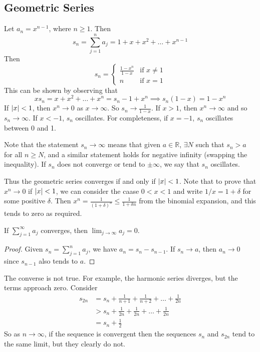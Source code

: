 \subsection{Geometric Series}
Let \(a_n = x^{n-1}\), where \(n \geq 1\). Then
\[ s_n = \sum_{j=1}^n a_j = 1 + x + x^2 + \dots + x^{n-1} \]
Then
\[ s_n = \begin{cases}
		\frac{1 - x^n}{1 - x} & \text{if } x \neq 1 \\
		n                     & \text{if } x = 1
	\end{cases} \]
This can be shown by observing that
\[ x s_n = x + x^2 + \dots + x^n = s_n - 1 + x^n \implies s_n(1-x) = 1-x^n \]
If \(\abs{x} < 1\), then \(x^n \to 0\) as \(x \to \infty\). So \(s_n \to \frac{1}{1-x}\). If \(x > 1\), then \(x^n \to \infty\) and so \(s_n \to \infty\). If \(x < -1\), \(s_n\) oscillates. For completeness, if \(x=-1\), \(s_n\) oscillates between 0 and 1.

Note that the statement \(s_n \to \infty\) means that given \(a \in \mathbb R\), \(\exists N\) such that \(s_n > a\) for all \(n \geq N\), and a similar statement holds for negative infinity (swapping the inequality). If \(s_n\) does not converge or tend to \(\pm \infty\), we say that \(s_n\) oscillates.

Thus the geometric series converges if and only if \(\abs{x} < 1\). Note that to prove that \(x^n \to 0\) if \(\abs{x} < 1\), we can consider the caase \(0 < x < 1\) and write \(1/x = 1 + \delta\) for some positive \(\delta\). Then \(x^n = \frac{1}{(1 + \delta)^n} \leq \frac{1}{1 + \delta n}\) from the binomial expansion, and this tends to zero as required.

\begin{lemma}
	If \(\sum_{j=1}^\infty a_j\) converges, then \(\lim_{j \to \infty} a_j = 0\).
\end{lemma}
\begin{proof}
	Given \(s_n = \sum_{j=1}^n a_j\), we have \(a_n = s_n - s_{n-1}\). If \(s_n \to a\), then \(a_n \to 0\) since \(s_{n-1}\) also tends to \(a\).
\end{proof}
\begin{remark}
	The converse is not true. For example, the harmonic series diverges, but the terms approach zero. Consider
	\begin{align*}
		s_{2n} & = s_n + \frac{1}{n+1} + \frac{1}{n+2} + \dots + \frac{1}{2n} \\
		       & > s_n + \frac{1}{2n} + \frac{1}{2n} + \dots + \frac{1}{2n}   \\
		       & = s_n + \frac{1}{2}
	\end{align*}
	So as \(n \to \infty\), if the sequence is convergent then the sequences \(s_n\) and \(s_{2n}\) tend to the same limit, but they clearly do not.
\end{remark}

